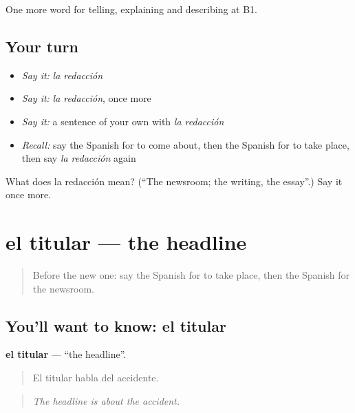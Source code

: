 \begin{grammarlens}[title={What you've built}]
One more word for telling, explaining and describing at B1.
\end{grammarlens}

\subsection*{Your turn}
\begin{itemize}
\raggedright
  \item \emph{Say it:} \emph{la redacción}
  \item \emph{Say it:} \emph{la redacción}, once more
  \item \emph{Say it:} a sentence of your own with \emph{la redacción}
  \item \emph{Recall:} say the Spanish for to come about, then the Spanish for to take place, then say \emph{la redacción} again
\end{itemize}

\begin{tcolorbox}[breakable,colback=teal!4,colframe=teal!35!black,title={Before you move on}]
What does la redacción mean? (\textquotedblleft{}The newsroom; the writing, the essay\textquotedblright{}.) Say it once more.
\end{tcolorbox}
\section[el titular]{el titular — the headline}

\label{lesson:ES-C513-titular}



\begin{quote}
Before the new one: say the Spanish for to take place, then the Spanish for the newsroom.
\end{quote}

\subsection*{You'll want to know: el titular}
\textbf{el titular} — \textquotedblleft{}the headline\textquotedblright{}.

\begin{quote}
El titular habla del accidente.
\end{quote}

\begin{quote}
\emph{The headline is about the accident.}
\end{quote}

